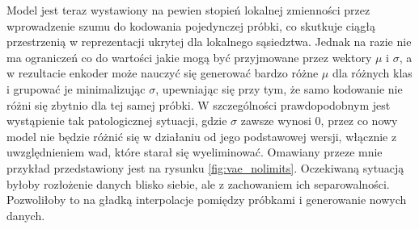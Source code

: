 Model jest teraz wystawiony na pewien stopień lokalnej zmienności przez wprowadzenie szumu do kodowania pojedynczej próbki, co skutkuje ciągłą przestrzenią w reprezentacji ukrytej dla lokalnego sąsiedztwa. Jednak na razie nie ma ograniczeń co do wartości jakie mogą być przyjmowane przez wektory $\mu$ i $\sigma$, a w rezultacie enkoder może nauczyć się generować bardzo różne $\mu$ dla różnych klas i grupować je minimalizując $\sigma$, upewniając się przy tym, że samo kodowanie nie różni się zbytnio dla tej samej próbki. W szczególności prawdopodobnym jest wystąpienie tak patologicznej sytuacji, gdzie $\sigma$ zawsze wynosi 0, przez co nowy model nie będzie różnić się w działaniu od jego podstawowej wersji, włącznie z uwzględnieniem wad, które starał się wyeliminować. Omawiany przeze mnie przykład przedstawiony jest na rysunku \ref{fig:vae_nolimits}. Oczekiwaną sytuacją byłoby rozłożenie danych blisko siebie, ale z zachowaniem ich separowalności. Pozwoliłoby to na gładką interpolacje pomiędzy próbkami i generowanie nowych danych.


